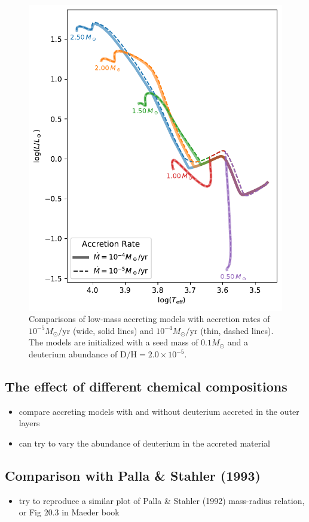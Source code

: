 \documentclass[12pt,a4paper]{article}
\newcommand{\mr}{\mathrm}
\newenvironment{outline}[1]{%
  \begin{itemize}[label=\textbullet]%
  \color{#1}%
}{%
  \end{itemize}%
}
\begin{document}
\begin{figure}
  \centering  
  \includegraphics[width=.65\textwidth,keepaspectratio]{comp_accrate.pdf}
  \caption{Comparisons of low-mass accreting models with accretion rates of $10^{-5} M_\odot/\mr{yr}$ (wide, solid lines) and $10^{-4} M_\odot/\mr{yr}$ (thin, dashed lines). The models are initialized with a seed mass of $0.1 M_\odot$ and a deuterium abundance of $\mr{D/H} = 2.0\times 10^{-5}$.} \label{fig:comp_accrate}
\end{figure}

\subsection{The effect of different chemical compositions}
\label{sec:chemical_composition}

\begin{outline}{gray}
  \item compare accreting models with and without deuterium accreted in the outer layers
  \item can try to vary the abundance of deuterium in the accreted material
\end{outline}

\subsection{Comparison with Palla \& Stahler (1993)}
\label{sec:comp_palla_stahler}

\begin{outline}{gray}
  \item try to reproduce a similar plot of Palla \& Stahler (1992) mass-radius relation, or Fig 20.3 in Maeder book
\end{outline}
\end{document}

